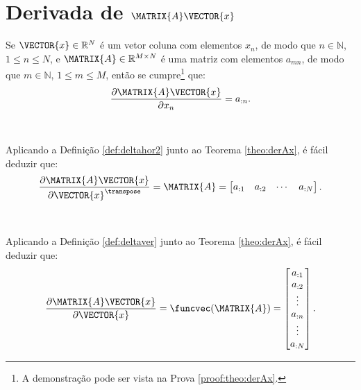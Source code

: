 
\section{Derivada de $\MATRIX{A}\VECTOR{x}$}

\begin{theorem}\label{theo:derAx}
Se 
$\VECTOR{x}\in \mathbb{R}^N$ é um vetor coluna com elementos $x_n$,
de modo que $n\in \mathbb{N}$, $1 \leq n \leq N$, e 
$\MATRIX{A} \in \mathbb{R}^{M\times N}$ é uma matriz com elementos $a_{mn}$,
de modo que $m\in \mathbb{N}$, $1 \leq m \leq M$, 
então se cumpre\footnote{A demonstração pode ser vista na Prova \ref{proof:theo:derAx}.} que:
\begin{equation}
\frac{\partial \MATRIX{A}\VECTOR{x}}{\partial x_n}=a_{:n}.
\end{equation}
\end{theorem}
~

\begin{corollary}\label{coro:derAx1}
Aplicando a Definição \ref{def:deltahor2} junto ao Teorema \ref{theo:derAx}, é
fácil deduzir que:
\begin{equation}
\frac{\partial \MATRIX{A}\VECTOR{x}}{\partial \VECTOR{x}^{\transpose}}=
\MATRIX{A}=
\left[
\begin{matrix}
 a_{:1} &  a_{:2} &  \cdots &  a_{:N}
\end{matrix}
\right].
\end{equation}
\end{corollary}
~

\begin{corollary}\label{coro:derAx2}
Aplicando a Definição \ref{def:deltaver} junto ao Teorema \ref{theo:derAx}, é
fácil deduzir que:
\begin{equation}
\frac{\partial \MATRIX{A}\VECTOR{x}}{\partial \VECTOR{x}}=\funcvec(\MATRIX{A})=
\left[
\begin{matrix}
 a_{:1} \\  
a_{:2} \\  
\vdots \\  
a_{:n} \\  
\vdots \\  
a_{:N}
\end{matrix}
\right].
\end{equation}
\end{corollary}

